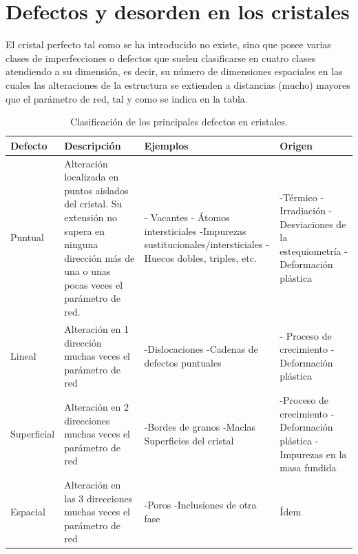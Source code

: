 \section{Defectos y desorden en los cristales}

El cristal perfecto tal como se ha introducido no existe, sino que posee varias clases de imperfecciones o defectos que suelen clasificarse en cuatro clases atendiendo a su dimensión, es decir, su número de dimensiones espaciales en las cuales las alteraciones de la estructura se extienden a distancias (mucho) mayores que el parámetro de red, tal y como se indica en la tabla.


\begin{table}[h!] \centering
    \begin{tabular}{m{2cm} | m{4cm} | m{4cm} | m{4cm}}
        Defecto & Descripción & Ejemplos & Origen \\ \hline \hline
        Puntual & Alteración localizada en puntos aislados del cristal. Su extensión no supera en ninguna dirección más de una o unas pocas veces el parámetro de red. & - Vacantes \newline - Átomos intersticiales \newline -Impurezas sustitucionales/intersticiales \newline -Huecos dobles, triples, etc. & -Térmico \newline -Irradiación \newline -Desviaciones de la estequiometría \newline -Deformación plástica \\ \hline
        Lineal & Alteración en 1 dirección muchas veces el parámetro de red & -Dislocaciones \newline -Cadenas de defectos puntuales & - Proceso de crecimiento \newline -Deformación plástica \\ \hline
        Superficial & Alteración en 2 direcciones muchas veces el parámetro de red & -Bordes de granos \newline -Maclas \newline Superficies del cristal & -Proceso de crecimiento \newline -Deformación plástica \newline -Impurezas en la masa fundida \\ \hline
        Espacial & Alteración en las 3 direcciones muchas veces el parámetro de red & -Poros \newline -Inclusiones de otra fase & Ídem \\ \hline
    \end{tabular}
    \caption{Clasificación de los principales defectos en cristales.}
    \label{Tab:01-02}
\end{table}





